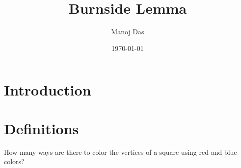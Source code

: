 \documentclass[11pt,twoside]{scrartcl}
\begin{document}
\title{Burnside Lemma}

\author{Manoj Das}
\date{\today}

\maketitle
\section{Introduction}

\section{Definitions}
\begin{example}
    How many ways are there to color the vertices of a square using red and blue colors?
\end{example}
\end{document}
